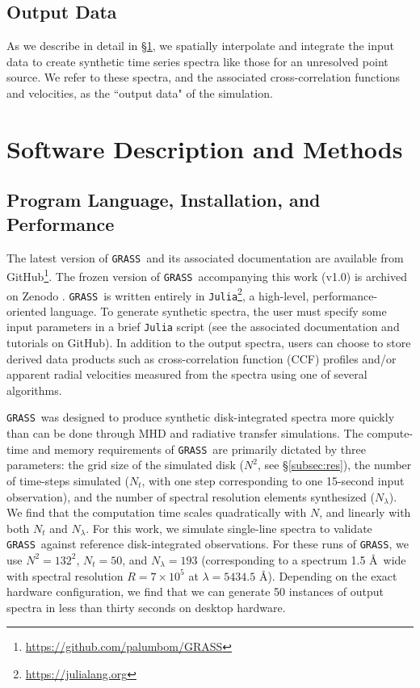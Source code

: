 \documentclass[twocolumn]{aastex63}
\newcommand{\grass}{\texttt{GRASS}}
\newcommand{\revise}[1]{#1}
\begin{document}
\subsection{Output Data} \label{subsec:output_data}
As we describe in detail in \S \ref{methods}, we spatially interpolate and integrate the input data to create synthetic time series spectra like those for an unresolved point source. We refer to these spectra, and the associated cross-correlation functions and velocities, as the ``output data" of the simulation. \par

\section{Software Description and Methods} \label{methods}

\subsection{Program Language, Installation, and Performance}
The latest version of \grass\ and its associated documentation are available from GitHub\footnote{\url{https://github.com/palumbom/GRASS}}. \revise{The frozen version of \grass\ accompanying this work (v1.0) is archived on Zenodo \citep{GRASS}.} \grass\ is written entirely in \texttt{Julia}\footnote{\url{https://julialang.org}}, a high-level, performance-oriented language. To generate synthetic spectra, the user must specify some input parameters in a brief \texttt{Julia} script (see the associated documentation and tutorials on GitHub). In addition to the output spectra, users can choose to store derived data products such as cross-correlation function (CCF) profiles and/or apparent radial velocities measured from the spectra using one of several algorithms. \par 

\grass\ was designed to produce synthetic disk-integrated spectra more quickly than can be done through MHD and radiative transfer simulations. The compute-time and memory requirements of \grass\ are primarily dictated by three parameters: the grid size of the simulated disk ($N^2$, see \S\ref{subsec:res}), the number of time-steps simulated ($N_t$, with one step corresponding to one 15-second input observation), and the number of spectral resolution elements synthesized ($N_\lambda$). We find that the computation time scales quadratically with $N$, and linearly with both $N_t$ and $N_\lambda$. For this work, we simulate single-line spectra to validate \grass\ against reference disk-integrated observations. For these runs of \grass, we use \revise{$N^2 = 132^2$}, $N_t = 50$, and $N_\lambda = 193$ (corresponding to a spectrum 1.5 \AA\ wide with spectral resolution $R = 7\times10^5$ at $\lambda = 5434.5$ \AA). Depending on the exact hardware configuration, we find that we can generate 50 instances of output spectra in less than \revise{thirty seconds} on desktop hardware. \par
\end{document}
